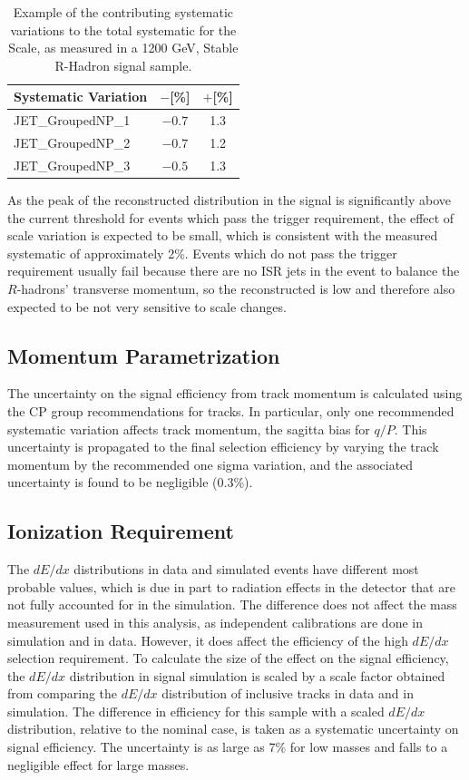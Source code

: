 \begin{table}
  \begin{center}
  \begin{tabular}{lcc}
  \hline
  Systematic Variation & $-$[\%]& $+$[\%] \\
  \hline
  JET\_GroupedNP\_1 & $-0.7$ & 1.3\\
  JET\_GroupedNP\_2 & $-0.7$ & 1.2\\
  JET\_GroupedNP\_3 & $-0.5$ & 1.3\\
  \hline
  \end{tabular}
  \end{center}
  \caption{Example of the contributing systematic variations to the total systematic for the \met Scale, as measured in a 1200 GeV, Stable R-Hadron signal sample.}
  \label{tab:met_syst_contributions}
\end{table}

As the peak of the reconstructed \met distribution in the signal is significantly above the current threshold for events which pass the trigger requirement, the effect of scale variation is expected to be small, which is consistent with the measured systematic of approximately 2\%. Events which do not pass the trigger requirement usually fail because there are no ISR jets in the event to balance the $R$-hadrons' transverse momentum, so the reconstructed \met is low and therefore also expected to be not very sensitive to scale changes.

\subsection{Momentum Parametrization}
The uncertainty on the signal efficiency from track momentum is calculated using the \ac{CP} group recommendations for tracks. 
In particular, only one recommended systematic variation affects track momentum, the sagitta bias for $q/P$. 
This uncertainty is propagated to the final selection efficiency by varying the track momentum by the recommended one sigma variation, and the associated uncertainty is found to be negligible (0.3\%). 

\subsection{Ionization Requirement}
The $dE/dx$ distributions in data and simulated events have different most probable values, which is due in part to radiation effects in the detector that are not fully accounted for in the simulation. 
The difference does not affect the mass measurement used in this analysis, as independent calibrations are done in simulation and in data. 
However, it does affect the efficiency of the high $dE/dx$ selection requirement. 
To calculate the size of the effect on the signal efficiency, the $dE/dx$ distribution in signal simulation is scaled by a scale factor obtained from comparing the $dE/dx$ distribution of inclusive tracks in data and in simulation. 
The difference in efficiency for this sample with a scaled $dE/dx$ distribution, relative to the nominal case, is taken as a systematic uncertainty on signal efficiency.
The uncertainty is as large as 7\% for low masses and falls to a negligible effect for large masses. 

